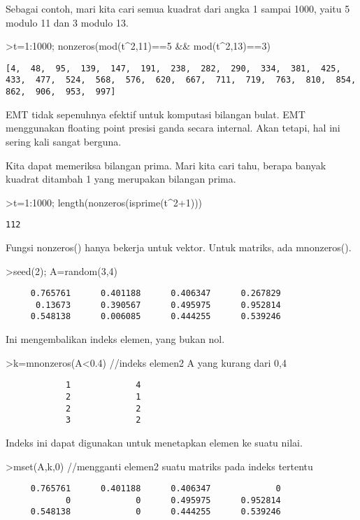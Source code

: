 \documentclass[
]{book}
\begin{document}
Sebagai contoh, mari kita cari semua kuadrat dari angka 1 sampai 1000, yaitu 5 modulo 11 dan 3 modulo 13.

\textgreater t=1:1000; nonzeros(mod(t\^{}2,11)==5 \&\& mod(t\^{}2,13)==3)

\begin{verbatim}
[4,  48,  95,  139,  147,  191,  238,  282,  290,  334,  381,  425,
433,  477,  524,  568,  576,  620,  667,  711,  719,  763,  810,  854,
862,  906,  953,  997]
\end{verbatim}

EMT tidak sepenuhnya efektif untuk komputasi bilangan bulat. EMT menggunakan floating point presisi ganda secara internal. Akan tetapi, hal ini sering kali sangat berguna.

Kita dapat memeriksa bilangan prima. Mari kita cari tahu, berapa banyak kuadrat ditambah 1 yang merupakan bilangan prima.

\textgreater t=1:1000; length(nonzeros(isprime(t\^{}2+1)))

\begin{verbatim}
112
\end{verbatim}

Fungsi nonzeros() hanya bekerja untuk vektor. Untuk matriks, ada mnonzeros().

\textgreater seed(2); A=random(3,4)

\begin{verbatim}
     0.765761      0.401188      0.406347      0.267829 
      0.13673      0.390567      0.495975      0.952814 
     0.548138      0.006085      0.444255      0.539246 
\end{verbatim}

Ini mengembalikan indeks elemen, yang bukan nol.

\textgreater k=mnonzeros(A\textless0.4) //indeks elemen2 A yang kurang dari 0,4

\begin{verbatim}
            1             4 
            2             1 
            2             2 
            3             2 
\end{verbatim}

Indeks ini dapat digunakan untuk menetapkan elemen ke suatu nilai.

\textgreater mset(A,k,0) //mengganti elemen2 suatu matriks pada indeks tertentu

\begin{verbatim}
     0.765761      0.401188      0.406347             0 
            0             0      0.495975      0.952814 
     0.548138             0      0.444255      0.539246 
\end{verbatim}
\end{document}
